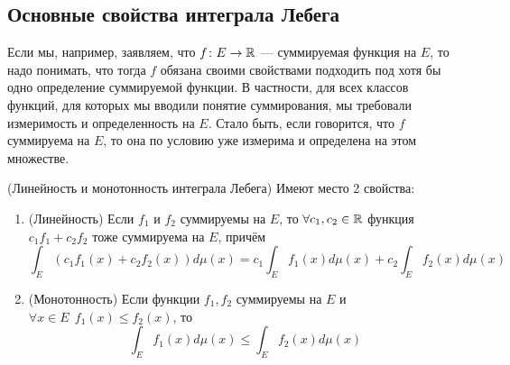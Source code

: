 \subsection{Основные свойства интеграла Лебега}

\begin{anote}
	Если мы, например, заявляем, что $f \colon E \to \mathbb{R}$ --- суммируемая функция на $E$, то надо понимать, что тогда $f$ обязана своими свойствами подходить под хотя бы одно определение суммируемой функции. В частности, для всех классов функций, для которых мы вводили понятие суммирования, мы требовали измеримость и определенность на $E$. Стало быть, если говорится, что $f$ суммируема на $E$, то она по условию уже измерима и определена на этом множестве.
\end{anote}

\begin{theorem} (Линейность и монотонность интеграла Лебега)
	Имеют место 2 свойства:
	\begin{enumerate}
		\item (Линейность) Если $f_1$ и $f_2$ суммируемы на $E$, то $\forall c_1, c_2 \in \mathbb{R}$ функция $c_1 f_1 + c_2 f_2$ тоже суммируема на $E$, причём
		\[
			\int_E (c_1f_1(x) + c_2f_2(x))d\mu(x) = c_1\int_E f_1(x)d\mu(x) + c_2\int_E f_2(x)d\mu(x)
		\]
		
		\item (Монотонность) Если функции $f_1, f_2$ суммируемы на $E$ и $\forall x \in E\ \ f_1(x) \le f_2(x)$, то
		\[
			\int_E f_1(x)d\mu(x) \le \int_E f_2(x)d\mu(x)
		\]
	\end{enumerate}
\end{theorem}

